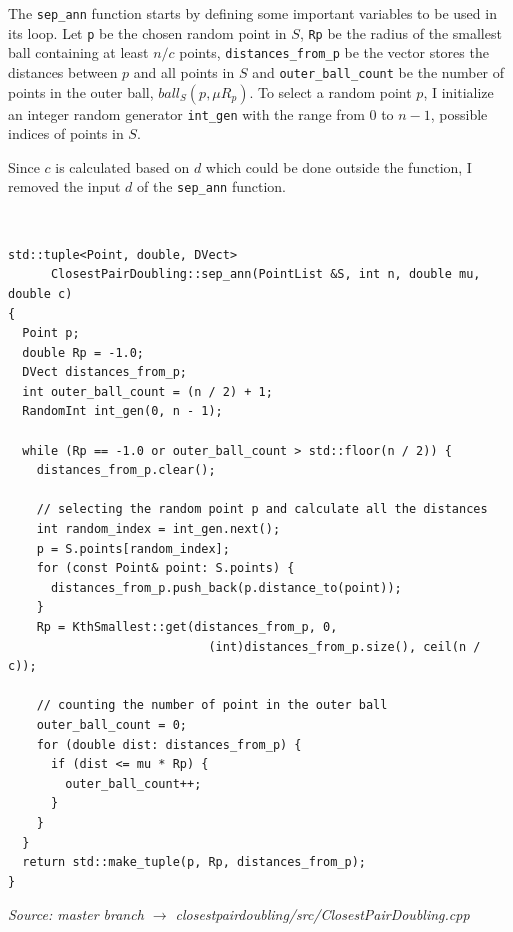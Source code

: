 \documentclass[12pt,english,]{article}
\newcommand{\code}[1]{\colorbox{light-gray}{\texttt{#1}}}
\begin{document}
The \code{sep\_ann} function starts by defining some important variables
to be used in its loop. Let \code{p} be the chosen random point in
\(S\), \code{Rp} be the radius of the smallest ball containing at least
\(n/c\) points, \code{distances\_from\_p} be the vector stores the
distances between \(p\) and all points in \(S\) and
\code{outer\_ball\_count} be the number of points in the outer ball,
\(ball_S(p,\mu R_p)\). To select a random point \(p\), I initialize an
integer random generator \code{int\_gen} with the range from 0 to
\(n - 1\), possible indices of points in \(S\).

Since \(c\) is calculated based on \(d\) which could be done outside the
function, I removed the input \(d\) of the \code{sep\_ann} function.

~

\begin{lstlisting}
std::tuple<Point, double, DVect>
      ClosestPairDoubling::sep_ann(PointList &S, int n, double mu, double c)
{
  Point p;
  double Rp = -1.0;
  DVect distances_from_p;
  int outer_ball_count = (n / 2) + 1;
  RandomInt int_gen(0, n - 1);

  while (Rp == -1.0 or outer_ball_count > std::floor(n / 2)) {
    distances_from_p.clear();

    // selecting the random point p and calculate all the distances
    int random_index = int_gen.next();
    p = S.points[random_index];
    for (const Point& point: S.points) {
      distances_from_p.push_back(p.distance_to(point));
    }
    Rp = KthSmallest::get(distances_from_p, 0,
                            (int)distances_from_p.size(), ceil(n / c));

    // counting the number of point in the outer ball
    outer_ball_count = 0;
    for (double dist: distances_from_p) {
      if (dist <= mu * Rp) {
        outer_ball_count++;
      }
    }
  }
  return std::make_tuple(p, Rp, distances_from_p);
}
\end{lstlisting}
\vspace{-9truemm}
\begin{minipage}{1\textwidth}
  \begin{flushright}
  {\footnotesize \emph{Source: master branch $\rightarrow$ closestpairdoubling/src/ClosestPairDoubling.cpp}\par}
  \end{flushright}
\end{minipage}
\vspace{0.5truemm}
\end{document}
